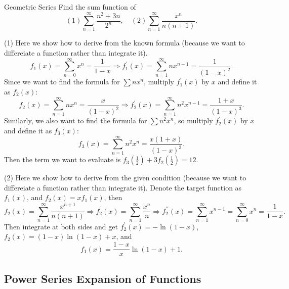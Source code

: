 \begin{example}{Geometric Series}{}
  Find the sum function of
  \begin{equation}
    (1) \sum\limits_{n = 1}^{\infty} \frac{n^2 + 3n}{2^n}, \quad
    (2) \sum\limits_{n = 1}^{\infty} \frac{x^n}{n(n+1)}.
  \end{equation}
\end{example}

\begin{solution}
  (1) Here we show how to derive from the known formula
  (because we want to differeiate a function rather than integrate it).
  \begin{equation}
    f_1(x) = \sum\limits_{n = 0}^{\infty} x^n = \frac{1}{1-x}
    \Rightarrow
    f_1^{\prime}(x) = \sum\limits_{n = 1}^{\infty} nx^{n-1} = \frac{1}{(1-x)^2}.
  \end{equation}
  Since we want to find the formula for $\sum nx^n$, multiply $f_1^{\prime}(x)$
  by $x$ and define it as $f_2(x)$:
  \begin{equation}
    f_2(x) = \sum\limits_{n = 1}^{\infty} nx^n = \frac{x}{(1-x)^2}
    \Rightarrow
    f_2^{\prime}(x) = \sum\limits_{n = 1}^{\infty} n^2x^{n-1} = \frac{1+x}{(1-x)^3}.
  \end{equation}
  Similarly, we also want to find the formula for $\sum n^2x^n$, so multiply $f_2^{\prime}(x)$
  by $x$ and define it as $f_3(x)$:
  \begin{equation}
    f_3(x) = \sum\limits_{n = 1}^{\infty} n^2x^n = \frac{x(1+x)}{(1-x)^3}.
  \end{equation}
  Then the term we want to evaluate is $f_3(\frac{1}{2}) + 3f_2(\frac{1}{2}) = 12$.

  (2) Here we show how to derive from the given condition
  (because we want to differeiate a function rather than integrate it).
  Denote the target function as $f_1(x)$, and $f_2(x) = xf_1(x)$, then
  \begin{equation}
    f_2(x) = \sum\limits_{n = 1}^{\infty} \frac{x^{n+1}}{n(n+1)}
    \Rightarrow f_2^{\prime}(x) = \sum\limits_{n = 1}^{\infty} \frac{x^n}{n}
    \Rightarrow f_2^{\prime\prime}(x) = \sum\limits_{n = 1}^{\infty} x^{n-1} = \sum\limits_{n = 0}^{\infty}x^n = \frac{1}{1-x}.
  \end{equation}
  Then integrate at both sides and get $f_2^{\prime}(x) = -\ln(1-x)$, $f_2(x) =
  (1-x)\ln(1-x) + x$, and
  \begin{equation}
    f_1(x) = \frac{1 - x}{x} \ln(1-x) + 1.
  \end{equation}
\end{solution}


\subsection{Power Series Expansion of Functions}




